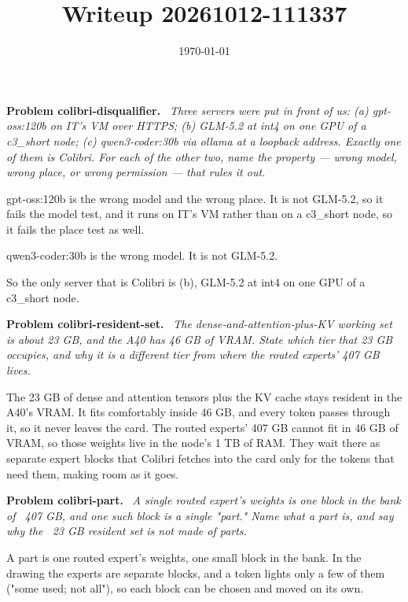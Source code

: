 \documentclass[11pt]{article}
\title{Writeup 20261012-111337}
\author{}
\date{\today}
\newenvironment{problem}[1]
  {\par\medskip\noindent\textbf{Problem #1.}\ \itshape}
  {\par\medskip}
\begin{document}
\maketitle


\begin{problem}{colibri-disqualifier}
Three servers were put in front of us: (a) gpt-oss:120b on IT's VM over HTTPS; (b) GLM-5.2 at int4 on one GPU of a c3\_short node; (c) qwen3-coder:30b via ollama at a loopback address. Exactly one of them is Colibri. For each of the other two, name the property --- wrong model, wrong place, or wrong permission --- that rules it out.
\end{problem}
gpt-oss:120b is the wrong model and the wrong place. It is not GLM-5.2, so it fails the model test, and it runs on IT's VM rather than on a c3\_short node, so it fails the place test as well.

qwen3-coder:30b is the wrong model. It is not GLM-5.2.

So the only server that is Colibri is (b), GLM-5.2 at int4 on one GPU of a c3\_short node.

\begin{problem}{colibri-resident-set}
The dense-and-attention-plus-KV working set is about 23 GB, and the A40 has 46 GB of VRAM. State which tier that 23 GB occupies, and why it is a different tier from where the routed experts' 407 GB lives.
\end{problem}
The 23 GB of dense and attention tensors plus the KV cache stays resident in the A40's VRAM. It fits comfortably inside 46 GB, and every token passes through it, so it never leaves the card. The routed experts' 407 GB cannot fit in 46 GB of VRAM, so those weights live in the node's 1 TB of RAM. They wait there as separate expert blocks that Colibri fetches into the card only for the tokens that need them, making room as it goes.

\begin{problem}{colibri-part}
A single routed expert's weights is one block in the bank of ~407 GB, and one such block is a single "part." Name what a part is, and say why the ~23 GB resident set is not made of parts.
\end{problem}
A part is one routed expert's weights, one small block in the bank. In the drawing the experts are separate blocks, and a token lights only a few of them ("some used; not all"), so each block can be chosen and moved on its own.
\end{document}
